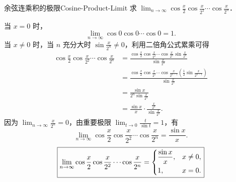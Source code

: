 \begin{problem}{余弦连乘积的极限}{Cosine-Product-Limit}
    求 $\lim_{n\to\infty} \cos \frac{x}{2} \cos \frac{x}{2^2} \cdots \cos \frac{x}{2^n}$．
\end{problem}

\begin{solution}
    当 $x = 0$ 时，
    \begin{equation}
        \lim_{n\to\infty} \cos 0 \cos 0 \cdots \cos 0 = 1.
    \end{equation}
    当 $x \neq 0$ 时，当 $n$ 充分大时 $\sin \frac{x}{2^n} \neq 0$，利用二倍角公式累乘可得
    \begin{equation}
        \begin{aligned}
            \cos \frac{x}{2} \cos \frac{x}{2^2} \cdots \cos \frac{x}{2^n} & = \frac{\cos \frac{x}{2} \cos \frac{x}{2^2} \cdots \cos \frac{x}{2^n} \sin \frac{x}{2^n}}{\sin \frac{x}{2^n}}                                    \\
                                                                          & = \frac{\cos \frac{x}{2} \cos \frac{x}{2^2} \cdots \cos \frac{x}{2^{n-1}} \left( \frac{1}{2} \sin \frac{x}{2^{n-1}} \right)}{\sin \frac{x}{2^n}} \\
                                                                          & = \frac{\sin x}{2^n \sin \frac{x}{2^n}}                                                                                                          \\
                                                                          & = \frac{\sin x}{x} \cdot \frac{\frac{x}{2^n}}{\sin \frac{x}{2^n}}.
        \end{aligned}
    \end{equation}
    因为 $\lim_{n\to\infty} \frac{x}{2^n} = 0$，由重要极限 $\lim_{t\to 0} \frac{t}{\sin t} = 1$，有
    \begin{equation}
        \lim_{n\to\infty} \cos \frac{x}{2} \cos \frac{x}{2^2} \cdots \cos \frac{x}{2^n} = \frac{\sin x}{x}.
    \end{equation}
    \begin{equation}
        \boxed{\lim_{n\to\infty} \cos \frac{x}{2} \cos \frac{x}{2^2} \cdots \cos \frac{x}{2^n} = \begin{dcases} \frac{\sin x}{x}, & x \neq 0, \\ 1, & x = 0. \end{dcases}}
    \end{equation}
\end{solution}

